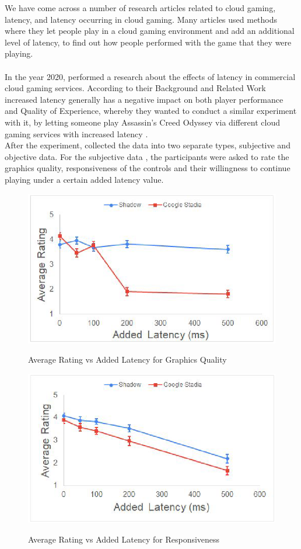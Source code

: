 We have come across a number of research articles related to cloud gaming, latency, and latency occurring in cloud gaming. Many articles used methods where they let people play in a cloud gaming environment and add an additional level of latency, to find out how people performed with the game that they were playing. 
\\\\
In the year 2020, \citeauthor{desveaux2020effects} performed a research about the effects of latency in commercial cloud gaming services. According to their Background and Related Work \parencite[Section 2.3, Page 17]{desveaux2020effects} increased latency generally has a negative impact on both player performance and Quality of Experience, whereby they wanted to conduct a similar experiment with it, by letting someone play Assassin's Creed Odyssey via different cloud gaming services with increased latency \parencite[Section 3, Page 18]{desveaux2020effects}.\\
After the experiment, \citeauthor{desveaux2020effects} collected the data into two separate types, subjective and objective data. For the subjective data \parencite[Section 4.2.2, Page 36]{desveaux2020effects}, the participants were asked to rate the graphics quality, responsiveness of the controls and their willingness to continue playing under a certain added latency value.
\begin{figure}[H]
	\centering
	\includegraphics[width=12cm]{../img/fig13.png}
	\caption{Average Rating vs Added Latency for Graphics Quality}
	\parencite[Section 4.2.2, Page 36, Figure 13]{desveaux2020effects}
\end{figure}
\begin{figure}[H]
	\centering
	\includegraphics[width=12cm]{../img/fig14.png}
	\caption{Average Rating vs Added Latency for Responsiveness}
	\parencite[Section 4.2.2, Page 37, Figure 14]{desveaux2020effects}
\end{figure}
